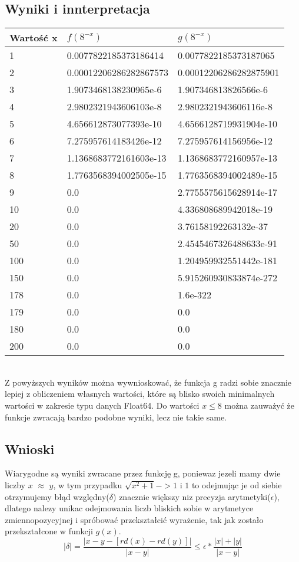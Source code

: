 \documentclass[11pt]{article}
\begin{document}
\subsection{Wyniki i innterpretacja}
\setlength{\tabcolsep}{2pt}
\renewcommand{\arraystretch}{1.3}
\begin{tabularx}{\textwidth}{|l|X|X|}
\hline
Wartość x & $f(8^{-x})$ & $g(8^{-x})$ \\
\hline
1 & 0.0077822185373186414 & 0.0077822185373187065 \\
\hline
2 & 0.00012206286282867573 & 0.00012206286282875901 \\
\hline
3 & 1.9073468138230965e-6 & 1.907346813826566e-6 \\
\hline
4 & 2.9802321943606103e-8 & 2.9802321943606116e-8 \\
\hline
5 & 4.656612873077393e-10 & 4.6566128719931904e-10 \\
\hline
6 & 7.275957614183426e-12 & 7.275957614156956e-12 \\
\hline
7 & 1.1368683772161603e-13 & 1.1368683772160957e-13 \\
\hline
8 & 1.7763568394002505e-15 & 1.7763568394002489e-15 \\
\hline
9 & 0.0 & 2.7755575615628914e-17 \\
\hline
10 & 0.0 & 4.336808689942018e-19 \\
\hline
20 & 0.0 & 3.76158192263132e-37 \\
\hline
50 & 0.0 & 2.4545467326488633e-91 \\
\hline
100 & 0.0 & 1.204959932551442e-181 \\
\hline
150 & 0.0 & 5.915260930833874e-272 \\
\hline
178 & 0.0 & 1.6e-322 \\
\hline
179 & 0.0 & 0.0 \\
\hline
180 & 0.0 & 0.0 \\
\hline
200 & 0.0 & 0.0 \\
\hline
\end{tabularx}
\vspace{25pt} \\
Z powyższych wyników można wywnioskować, że funkcja g radzi sobie znacznie lepiej z obliczeniem własnych wartości, które są blisko swoich minimalnych wartości w zakresie typu danych Float64. Do wartości $x\leq8$ można zauważyć że funkcje zwracają bardzo podobne wyniki, lecz nie takie same.

\subsection{Wnioski}
Wiarygodne są wyniki zwracane przez funkcję g, poniewaz jezeli mamy dwie liczby $x$ $\approx$ $y$, w tym przypadku $\sqrt{x^2+1}->1$ i $1$ to odejmując je od siebie otrzymujemy błąd względny($\delta$) znacznie większy niz precyzja arytmetyki($\epsilon$), dlatego nalezy unikac odejmowania liczb bliskich sobie w arytmetyce zmiennopozycyjnej i spróbować przekształcić wyrażenie, tak jak zostało przekształcone w funkcji $g(x)$. 
$$\left |\delta \right |=\frac{\left|x-y-\left[rd(x)-rd(y)\right]\right|}{\left|x-y\right|}\leq \epsilon*\frac{\left |x\right| + \left|y\right|}{\left|x-y\right|} $$
\end{document}
